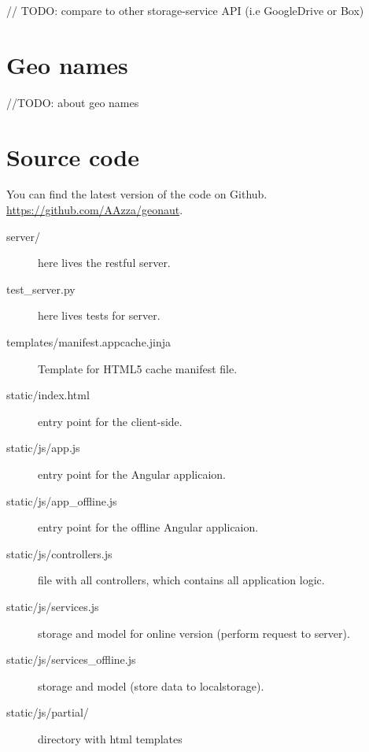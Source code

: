 \documentclass[12pt,a4paper]{article}
\begin{document}
// TODO: compare to other storage-service API (i.e GoogleDrive or Box)

\section{Geo names}
//TODO: about geo names

\section{Source code}
    You can find the latest version of the code on Github.
    \url{https://github.com/AAzza/geonaut}.

    \begin{description}
        \item[server/] here lives the restful server.
        \item[test\_server.py] here lives tests for server.
        \item[templates/manifest.appcache.jinja] Template for HTML5 cache manifest file.
        \item[static/index.html] entry point for the client-side.
        \item[static/js/app.js] entry point for the Angular applicaion.
        \item[static/js/app\_offline.js] entry point for the offline Angular applicaion.
        \item[static/js/controllers.js] file with all controllers, which contains all application logic.
        \item[static/js/services.js] storage and model for online version (perform request to server).
        \item[static/js/services\_offline.js] storage and model (store data to localstorage).
        \item[static/js/partial/] directory with html templates
    \end{description}
\end{document}
